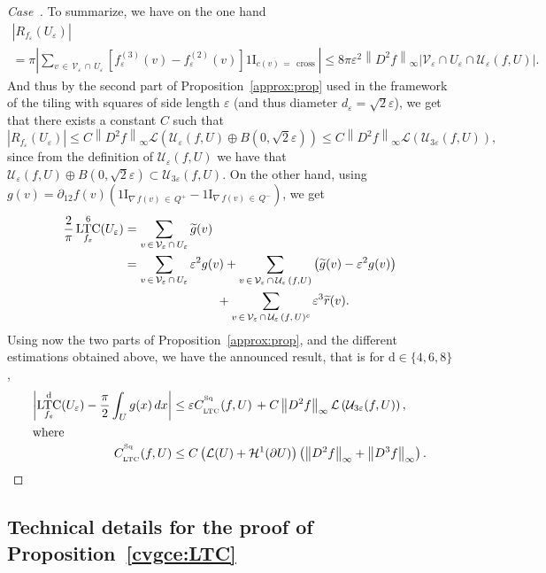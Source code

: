 \documentclass[AHL,Unicode,longabstracts,published]{cedram}
\newcommand{\ind}{{1\!\!\mathrm{I}}}
\newcommand{\eps}{\varepsilon}
\DeclareMathOperator{\LTC}{LTC}
\newcommand{\dd}{\mathrm{d}}
\DeclareMathOperator{\Sq}{Sq}
\DeclareMathOperator{\cross}{cross}
\newcommand{\calH}{\mathcal{H}}
\newcommand{\calL}{\mathcal{L}}
\newcommand{\calV}{\mathcal{V}}
\newcommand{\calU}{\mathcal{U}}
\newcounter{casecount}
\newenvironment{lastcase}{\refstepcounter{casecount}\begin{proof}[Case~\thecasecount]}{\end{proof}}
\let\oldtilde\tilde
\renewcommand*{\tilde}[1]{\mathchoice{\widetilde{#1}}{\widetilde{#1}}{\oldtilde{#1}}{\oldtilde{#1}}}
\begin{document}
\begin{lastcase}
To summarize, we have on the one hand
\begin{multline*}
\left| R_{f_\eps}(U_\eps)\right|\\
= \pi \left| \sum_{v\,\in\,\calV_\eps\,\cap\,U_\eps}
\left[f_\eps^{(3)}(v) - f_\eps^{(2)}(v)\right] \ind_{c(v)\,=\,\cross} \right| \leq 8 \pi \eps^2 \left\|D^2 f\right\|_\infty \left| \calV_\eps\cap U_\eps\cap\calU_{\eps}(f,U) \right|.
\end{multline*}
And thus by the second part of Proposition~\ref{approx:prop} used in the framework of the tiling with squares of side length $\eps$ (and thus diameter $d_\eps=\sqrt{2}\eps$), we get that there exists a constant $C$ such that
\[
\left| R_{f_\eps}(U_\eps) \right|\leq C \left\|D^2 f\right\|_\infty \calL \left(\calU_{\eps}(f,U) \oplus B\left(0,\sqrt{2}\eps\right)\right) \leq C \left\|D^2 f\right\|_\infty
\calL \left(\calU_{3\eps}(f,U)\right),
\]
since from the definition of $\calU_{\eps}(f,U)$ we have that $\calU_{\eps}(f,U) \oplus B(0,\sqrt{2}\eps) \subset \calU_{3\eps}(f,U)$. On the other hand, using $g(v)=\partial_{12} f(v)(\ind_{\nabla\,f(v)\,\in\,Q^+} -\ind_{\nabla\,f(v) \,\in\,Q^-})$, we get
\begin{align*}
\frac{2}{\pi} \LTC^6_{f_\eps}(U_\eps) & = \sum_{v\,\in\,\calV_\varepsilon\,\cap\,U_\eps} \tilde{g}(v) \\
& = \sum_{v\,\in\,\calV_\varepsilon\,\cap\,U_\eps} \eps^2 g(v) + \sum_{v\,\in\,\calV_\varepsilon\,\cap\,\calU_{\eps}\,(f,U)} \left(\tilde{g}(v) -\eps^2 g(v) \right)\\
& \mkern135mu + \sum_{v\,\in\,\calV_\varepsilon\,\cap\,\calU_{\eps}\,(f,\,U)^c} \eps^3 \tilde{r}(v).
\end{align*}
Using now the two parts of Proposition~\ref{approx:prop}, and the different estimations obtained above, we have the announced result, that is for $\dd\in\{4,6,8\}$,
\begin{align*}
\left| \LTC^{\dd}_{f_\eps}(U_\eps) - \frac{\pi}{2}\int_U g(x) \, dx
\right| &\leq \eps C_{_{\LTC}}^{^{\Sq}}(f,U)\, + C \left\|D^2 f\right\|_\infty \calL\left(\calU_{3\eps}(f,U)\right),
\\
\intertext{where}
C_{_{\LTC}}^{^{\Sq}}(f,U) & \le C\left(\calL(U)+\calH^1(\partial U)\right)\left(\left\|D^2f\right\|_\infty+\left\|D^3f\right\|_\infty\right).\qedhere
\end{align*}
\end{lastcase}


\subsection{Technical details for the proof of Proposition~\ref{cvgce:LTC}}\label{cvLTC:app}
\end{document}
